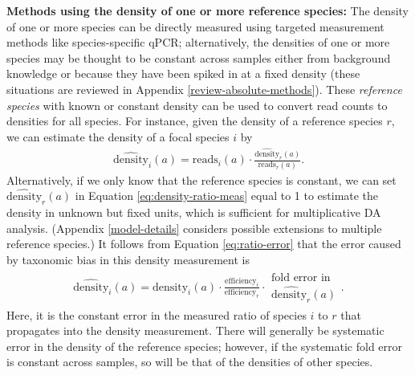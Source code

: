 \documentclass[
]{article}
\begin{document}
\textbf{Methods using the density of one or more reference species:}
The density of one or more species can be directly measured using targeted measurement methods like species-specific qPCR; alternatively, the densities of one or more species may be thought to be constant across samples either from background knowledge or because they have been spiked in at a fixed density (these situations are reviewed in Appendix \ref{review-absolute-methods}).
These \emph{reference species} with known or constant density can be used to convert read counts to densities for all species.
For instance, given the density of a reference species \(r\), we can estimate the density of a focal species \(i\) by
\begin{align}
  \label{eq:density-ratio-meas}
  \widehat{\text{density}}_{i}(a) = \text{reads}_{i}(a) \cdot \frac{\widehat{\text{density}}_{r}(a)}{\text{reads}_{r}(a)}.
\end{align}
Alternatively, if we only know that the reference species is constant, we can set \(\widehat{\text{density}}_{r}(a)\) in Equation \eqref{eq:density-ratio-meas} equal to 1 to estimate the density in unknown but fixed units, which is sufficient for multiplicative DA analysis.
(Appendix \ref{model-details} considers possible extensions to multiple reference species.)
It follows from Equation \eqref{eq:ratio-error} that the error caused by taxonomic bias in this density measurement is
\begin{align}
  \label{eq:density-ratio-error}
  \widehat{\text{density}}_{i}(a) 
  = \text{density}_{i}(a) \cdot \frac{\text{efficiency}_{i}}{\text{efficiency}_{r}} 
  \cdot \begin{array}{c} \text{fold error in} \\ \widehat{\text{density}_r}(a) \end{array}.
\end{align}
Here, it is the constant error in the measured ratio of species \(i\) to \(r\) that propagates into the density measurement.
There will generally be systematic error in the density of the reference species; however, if the systematic fold error is constant across samples, so will be that of the densities of other species.
\end{document}
